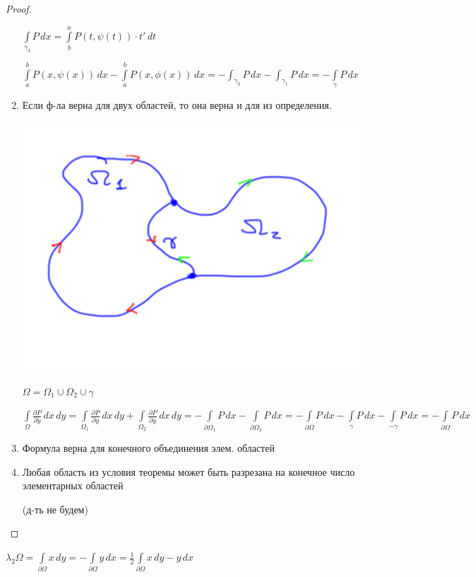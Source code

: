 \begin{proof}
\begin{enumerate}[Шаг 1.]
		$\int\limits_{\gamma_3} P\,dx = \int\limits_{b}^{a} P(t, \psi(t)) \cdot t' \,dt$
		
		$\int\limits_a^b P(x, \psi(x)) \,dx -\int\limits_a^b P(x, \phi(x)) \,dx = -\int_{\gamma_3} P\,dx -\int_{\gamma_1} P\,dx = -\int\limits_\gamma P \,dx$

		\item
		Если ф-ла верна для двух областей, то она верна и для из определения. 
		
		\includegraphics[scale=0.5]{pic_2}
		
		$\Omega = \Omega_1 \cup \Omega_2 \cup \gamma$
		
		$\int\limits_\Omega \frac{\partial P}{\partial y}\,dx\,dy = \int\limits_{\Omega_1} \frac{\partial P}{\partial y}\,dx\,dy + \int\limits_{\Omega_2} \frac{\partial P}{\partial y}\,dx\,dy = -\int\limits_{\partial \Omega_1} P \,dx -\int\limits_{\partial \Omega_2} P \,dx = -\int\limits_{\partial \Omega} P \,dx - \int\limits_{\gamma} P \,dx - \int\limits_{-\gamma} P \,dx = -\int\limits_{\partial \Omega} P \,dx $

		\item
		Формула верна для конечного объединения элем. областей
		
		\item
		Любая область из условия теоремы может быть разрезана на конечное число элементарных областей
		
		(д-ть не будем)

	\end{enumerate}
\end{proof}

\begin{consequence}\thmslashn

	$\lambda_2 \Omega = \int\limits_{\partial \Omega} x \,dy = - \int\limits_{\partial \Omega} y \,dx = \frac{1}{2} \int\limits_{\partial \Omega} x \,dy - y \,dx $

\end{consequence}

